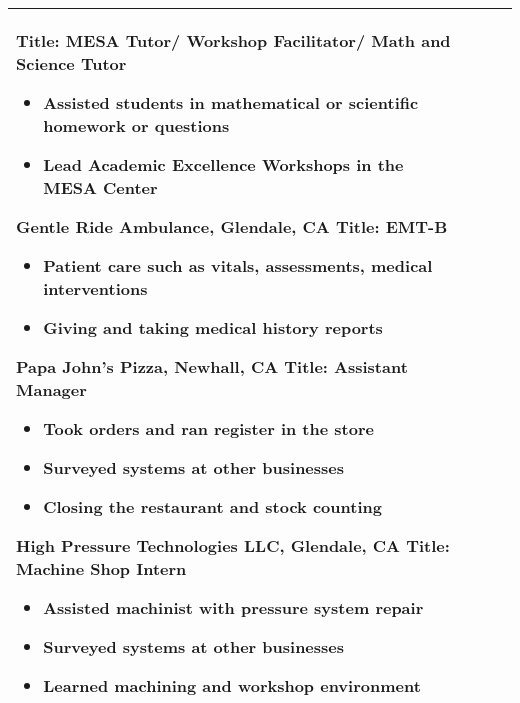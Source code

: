 \documentclass[10pt]{article}
\begin{document}
\begin{tabular}{l l l l}
{        Title: MESA Tutor/ Workshop Facilitator/ Math and Science Tutor
        \begin{itemize}[noitemsep,nolistsep]
            \item Assisted students in mathematical or scientific homework or questions
            \item Lead Academic Excellence Workshops in the MESA Center
        \end{itemize}
        Gentle Ride Ambulance, Glendale, CA \newline
        Title: EMT-B
        \begin{itemize}[noitemsep,nolistsep]
            \item Patient care such as vitals, assessments, medical interventions
            \item Giving and taking medical history reports
        \end{itemize}
        Papa John's Pizza, Newhall, CA \newline
        Title: Assistant Manager
        \begin{itemize}[noitemsep,nolistsep]
            \item Took orders and ran register in the store
            \item Surveyed systems at other businesses
            \item Closing the restaurant and stock counting
        \end{itemize}
        High Pressure Technologies LLC, Glendale, CA \newline
        Title: Machine Shop Intern
        \begin{itemize}[noitemsep,nolistsep]
            \item Assisted machinist with pressure system repair
            \item Surveyed systems at other businesses
            \item Learned machining and workshop environment
        \end{itemize}} \\ \hline
\end{tabular}
\end{document}
